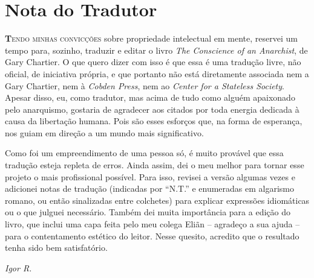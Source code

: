 
\chapter{Nota do Tradutor}

\lettrine[lines=2]{\textcolor{LettrineColor}{\textbf{T}}}{endo minhas convicções} sobre propriedade intelectual em mente, reservei um tempo para, sozinho, traduzir e editar o livro \emph{The Conscience of an Anarchist}, de Gary Chartier. O que quero dizer com isso é que essa é uma tradução livre, não oficial, de iniciativa própria, e que portanto não está diretamente associada nem a Gary Chartier, nem à \emph{Cobden Press}, nem ao \emph{Center for a Stateless Society}. Apesar disso, eu, como tradutor, mas acima de tudo como alguém apaixonado pelo anarquismo, gostaria de agradecer aos citados por toda energia dedicada à causa da libertação humana. Pois são esses esforços que, na forma de esperança, nos guiam em direção a um mundo mais significativo.

Como foi um empreendimento de uma pessoa só, é muito provável que essa tradução esteja repleta de erros. Ainda assim, dei o meu melhor para tornar esse projeto o mais profissional possível. Para isso, revisei a versão algumas vezes e adicionei notas de tradução (indicadas por ``N.T.'' e enumeradas em algarismo romano, ou então sinalizadas entre colchetes) para explicar expressões idiomáticas ou o que julguei necessário. Também dei muita importância para a edição do livro, que inclui uma capa feita pelo meu colega Eliãn -- agradeço a sua ajuda -- para o contentamento estético do leitor. Nesse quesito, acredito que o resultado tenha sido bem satisfatório.

\begin{flushright}
\large\emph{Igor R.}
\end{flushright}
